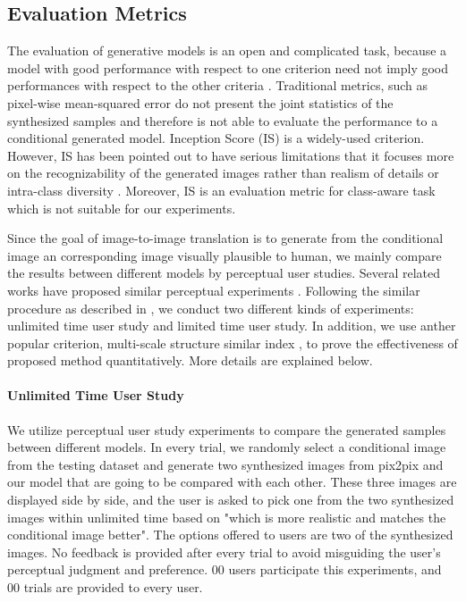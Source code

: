 \subsection{ Evaluation Metrics}
\label{subsec:ablation}
The evaluation of generative models is an open and complicated task, because a model with good performance with respect to one criterion need not imply good performances with respect to the other criteria \cite{evaluation, GANs_equal}. Traditional metrics, such as pixel-wise mean-squared error do not present the joint statistics of the synthesized samples and therefore is not able to evaluate the performance to a conditional generated model. 
Inception Score (IS) \cite{Improved_Techniques} is a widely-used criterion. However, IS has been pointed out to have serious limitations that it focuses more on the recognizability of the generated images rather than realism of details or intra-class diversity \cite{evaluation}. Moreover, IS is an evaluation metric for class-aware task which is not suitable for our experiments.
 
Since the goal of image-to-image translation is to generate from the conditional image an corresponding image visually plausible to human, we mainly compare the results between different models by perceptual user studies. Several related works have proposed similar perceptual experiments \cite{LaplaceGANs, SRGANs, Improved_Techniques, CRN, pix2pixHD}. Following the similar procedure as described in \cite{CRN}, we conduct two different kinds of experiments: unlimited time user study and limited time user study. 
In addition, we use anther popular criterion, multi-scale structure similar index \cite{FID}, to prove the effectiveness of proposed method quantitatively. More details are explained below.
\paragraph{Unlimited Time User Study}
We utilize perceptual user study experiments to compare the generated samples between different models. In every trial, we randomly select a conditional image from the testing dataset and generate two synthesized images from pix2pix and our model that are going to be compared with each other. These three images are displayed side by side, and the user is asked to pick one from the two synthesized images within unlimited time based on "which is more realistic and matches the conditional image better". The options offered to users are two of the synthesized images. No feedback is provided after every trial to avoid misguiding the user's perceptual judgment and preference. 00 users participate this experiments, and 00 trials are provided to every user. 
